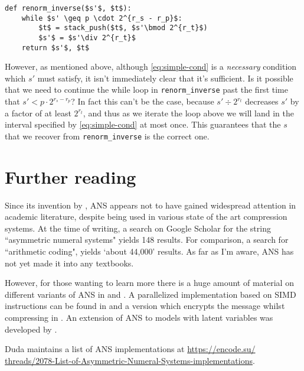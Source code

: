 \documentclass{article}
\theoremstyle{definition}
\begin{document}
\begin{lstlisting}
def renorm_inverse($s'$, $t$):
    while $s' \geq p \cdot 2^{r_s - r_p}$:
        $t$ = stack_push($t$, $s'\bmod 2^{r_t}$)
        $s'$ = $s'\div 2^{r_t}$
    return $s'$, $t$
\end{lstlisting}

However, as mentioned above, although \cref{eq:simple-cond} is a
\emph{necessary} condition which \(s'\) must satisfy, it isn't immediately
clear that it's sufficient. Is it possible that we need to continue the while
loop in \texttt{renorm\_inverse} past the first time that \(s'<p\cdot2^{r_s -
r_p}\)? In fact this can't be the case, because \(s'\div2^{r_t}\) decreases
\(s'\) by a factor of at least \(2^{r_t}\), and thus as we iterate the loop
above we will land in the interval specified by \cref{eq:simple-cond} at most
once. This guarantees that the \(s\) that we recover from
\texttt{renorm\_inverse} is the correct one.

\section{Further reading}
Since its invention by \citet{duda2009}, ANS appears not to have gained
widespread attention in academic literature, despite being used in various
state of the art compression systems. At the time of writing, a search on
Google Scholar for the string ``asymmetric numeral systems" yields 148 results.
For comparison, a search for ``arithmetic coding", yields `about 44,000'
results. As far as I'm aware, ANS has not yet made it into any textbooks.

However, for those wanting to learn more there is a huge amount of material on
different variants of ANS in \citet{duda2009} and \citet{duda2015}. A
parallelized implementation based on SIMD instructions can be found in
\citet{giesen2014} and a version which encrypts the message whilst compressing
in \citet{duda2016}.  An extension of ANS to models with latent variables was
developed by \citet{townsend2019}.

Duda maintains a list of ANS implementations at
\url{
  https://encode.su/
  threads/2078-List-of-Asymmetric-Numeral-Systems-implementations}.
\printbibliography
\end{document}
